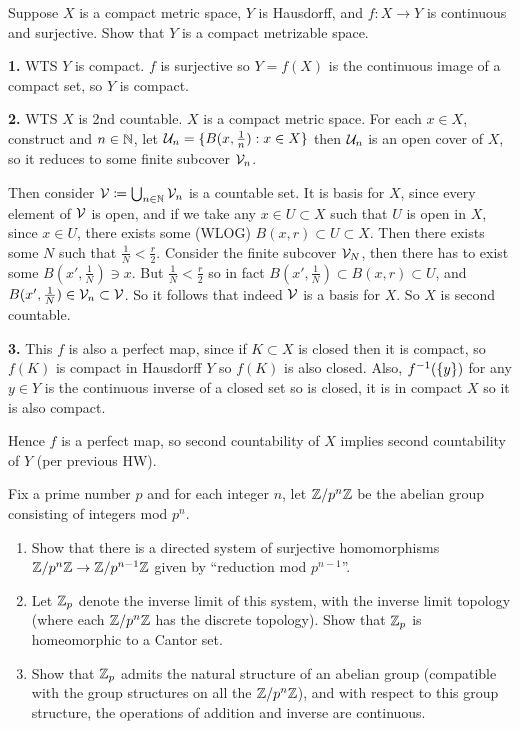 \documentclass[a4paper, 10pt]{article}
\begin{document}
\begin{problem} [\done]
    Suppose $X$ is a compact metric space, $Y$ is Hausdorff, and $f: X \to Y$ is continuous and surjective. Show that $Y$ is a compact metrizable space.
\end{problem}
\begin{solution}
    \textbf{1.} WTS $Y$ is compact. $f$ is surjective so $Y = f(X)$ is the continuous image of a compact set, so $Y$ is compact.

    \textbf{2.} WTS $X$ is 2nd countable. $X$ is a compact metric space. For each $x \in X$, construct and $n \in \mathbb{N}$, let $\mathcal{U}_n = \{B(x, \frac{1}{n}) : x \in X\}$ then $\mathcal{U}_n$ is an open cover of $X$, so it reduces to some finite subcover $\mathcal{V}_n$.

    Then consider $\mathcal{V} \coloneqq \bigcup_{n \in \mathbb{N}} \mathcal{V}_n$ is a countable set. It is basis for $X$, since every element of $\mathcal{V}$ is open, and if we take any $x \in U \subset X$ such that $U$ is open in $X$, since $x \in U$, there exists some (WLOG) $B(x, r) \subset U \subset X$. Then there exists some $N$ such that $\frac{1}{N} < \frac{r}{2}$. Consider the finite subcover $\mathcal{V}_N$, then there has to exist some $B(x', \frac{1}{N}) \ni x$. But $\frac{1}{N} < \frac{r}{2}$ so in fact $B(x', \frac{1}{N}) \subset B(x, r) \subset U$, and $B(x', \frac{1}{N}) \in \mathcal{V}_n \subset \mathcal{V}$. So it follows that indeed $\mathcal{V}$ is a basis for $X$. So $X$ is second countable.

    \textbf{3.} This $f$ is also a perfect map, since if $K \subset X$ is closed then it is compact, so $f(K)$ is compact in Hausdorff $Y$ so $f(K)$ is also closed. Also, ${f}^{-1}(\{y\})$ for any $y \in Y$ is the continuous inverse of a closed set so is closed, it is in compact $X$ so it is also compact.

    Hence $f$ is a perfect map, so second countability of $X$ implies second countability of $Y$ (per previous HW).
    
\end{solution}

\begin{problem} [\done]
    Fix a prime number $p$ and for each integer $n$, let $\mathbb{Z}/p^n \mathbb{Z}$ be the abelian group consisting of integers mod $p^n$.
    \begin{enumerate}
    \item Show that there is a directed system of surjective homomorphisms $\mathbb{Z} / p^n \mathbb{Z} \to \mathbb{Z} / p^{n-1} \mathbb{Z}$ given by ``reduction mod $p^{n-1}$''.
    \item Let $\mathbb{Z}_p$ denote the inverse limit of this system, with the inverse limit topology (where each $\mathbb{Z}/p^n \mathbb{Z}$ has the discrete topology). Show that $\mathbb{Z}_p$ is homeomorphic to a Cantor set.
    \item Show that $\mathbb{Z}_p$ admits the natural structure of an abelian group (compatible with the group structures on all the $\mathbb{Z} / p^n \mathbb{Z}$), and with respect to this group structure, the operations of addition and inverse are continuous.
    \end{enumerate}
\end{problem}
\end{document}
